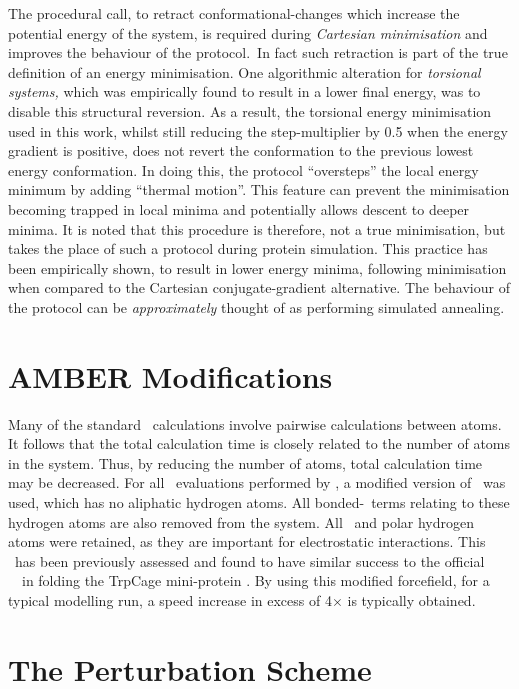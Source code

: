 The procedural call, to retract conformational-changes which increase the potential energy of the system, is required during \emph{Cartesian minimisation} and improves the behaviour of the protocol.\ In fact such retraction is part of the true definition of an energy minimisation. One algorithmic alteration for \emph{torsional systems,} which was empirically found to result in a lower final energy, was to disable this structural reversion. As a result, the torsional energy minimisation used in this work, whilst still reducing the step-multiplier by 0.5 when the energy gradient is positive, does not revert the conformation to the previous lowest energy conformation. In doing this, the protocol ``oversteps'' the local energy minimum by adding ``thermal motion''. This feature can prevent the minimisation becoming trapped in local minima and potentially allows descent to deeper minima. It is noted that this procedure is therefore, not a true minimisation, but takes the place of such a protocol during protein simulation. This practice has been empirically shown, to result in lower energy minima, following minimisation when compared to the  Cartesian conjugate-gradient alternative\cite{THESIS:BREWER}.
The behaviour of the protocol can be \emph{approximately} thought of as performing simulated annealing.

\section{AMBER Modifications}

Many of the standard \forcefield\ calculations involve pairwise calculations between atoms.
It follows that the total calculation time is closely related to the number of atoms in the system. Thus, by reducing the number of atoms, total calculation time may be decreased.
For all \forcefield\ evaluations performed by \prearcus, a modified version of \amberff\ was used, which has no aliphatic hydrogen atoms. All bonded-\forcefield\ terms relating to these hydrogen atoms are also removed from the system. All \mainchain\ and polar hydrogen atoms  were retained, as they are important for electrostatic interactions.
This \forcefield\ has been previously assessed and found to have similar success to the official \amber\ \forcefield\  in folding the TrpCage mini-protein \cite{THESIS:BREWER}. By using this modified forcefield, for a typical modelling run, a speed increase in excess of 4$\times$ is typically obtained.


\section{The Perturbation Scheme}

